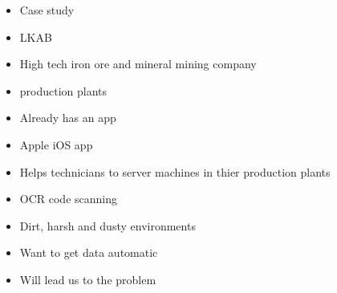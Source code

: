 \begin{itemize}
\item Case study
\item LKAB
\item High tech iron ore and mineral mining company
\item production plants
\item Already has an app
\item Apple iOS app
\item Helps technicians to server machines in thier production plants
\item OCR code scanning
\item Dirt, harsh and dusty environments
\item Want to get data automatic
\item Will lead us to the problem
\end{itemize}
